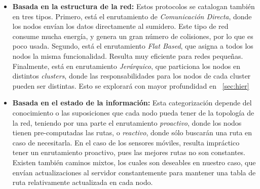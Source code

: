 \documentclass[10pt,preprint,onecolumn]{paper}
\begin{document}
\begin{itemize}
\item \textbf{Basada en la estructura de la red:} Estos protocolos se catalogan también en tres tipos. Primero, está el enrutamiento de \emph{Comunicación Directa}, donde los nodos envían los datos directamente al sumidero. Este tipo de red consume mucha energía, y genera un gran número de colisiones, por lo que es poco usada. Segundo, está el enrutamiento \emph{Flat Based}, que asigna a todos los nodos la misma funcionalidad. Resulta muy eficiente para redes pequeñas. Finalmente, está en enrutamiento \emph{Jerárquico}, que particiona los nodos en distintos \emph{clusters}, donde las responsabilidades para los nodos de cada cluster pueden ser distintas. Esto se explorará con mayor profundidad en ~\ref{sec:hier}

\item \textbf{Basada en el estado de la información:} Esta categorización depende del conocimiento o las suposiciones que cada nodo pueda tener de la topología de la red, teniendo por una parte el enrutamiento \emph{proactivo}, donde los nodos tienen pre-computadas las rutas, o \emph{reactivo}, donde sólo buscarán una ruta en caso de necesitarla. En el caso de los sensores móviles, resulta impráctico tener un enrutamiento proactivo, pues las mejores rutas no son constantes. Existen también caminos mixtos, los cuales son deseables en nuestro caso, que envían actualizaciones al servidor constantemente para mantener una tabla de ruta relativamente actualizada en cada nodo.

\end{itemize}
\end{document}
